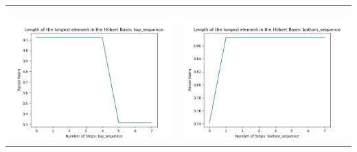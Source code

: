 \documentclass[10pt]{article}
\begin{document}
\begin{tabular}{c|c}
\begin{minipage}{.45\textwidth}
\end{minipage} \\ \\
\hline \\\begin{minipage}{.45\textwidth}
\includegraphics[width=\textwidth]{"DATA/5d/5 generators 2 bound A/top_sequence LENGTH"}
\end{minipage} &
\begin{minipage}{.45\textwidth}
\includegraphics[width=\textwidth]{"DATA/5d/5 generators 2 bound A bottomup/bottom_sequence LENGTH"}
\end{minipage}
\end{tabular}
\end{document}

